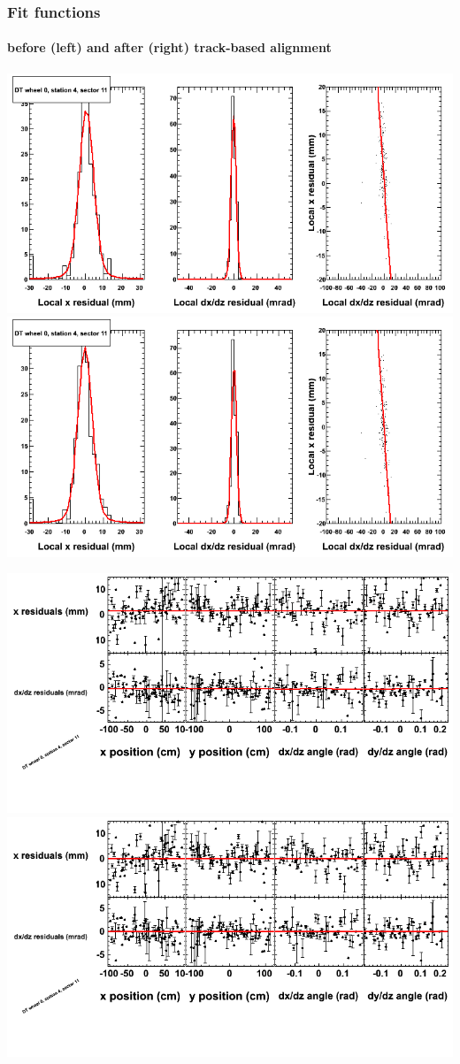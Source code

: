 \documentclass[compress]{beamer}
\begin{document}
\begin{frame}
\frametitle{Fit functions}
\framesubtitle{before (left) and after (right) track-based alignment}
\includegraphics[width=0.5\linewidth]{fitfunctions_re01/MBwhCst4sec11_bellcurves.png} \includegraphics[width=0.5\linewidth]{fitfunctions_re05/MBwhCst4sec11_bellcurves.png}

\includegraphics[width=0.5\linewidth]{fitfunctions_re01/MBwhCst4sec11_polynomials.png} \includegraphics[width=0.5\linewidth]{fitfunctions_re05/MBwhCst4sec11_polynomials.png}
\end{frame}
\end{document}

